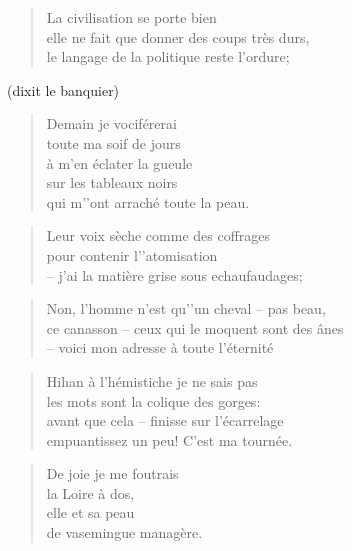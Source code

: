   \begin{verse}
    La civilisation se porte bien\\
    elle ne fait que donner des coups très durs,\\
    le langage de la politique reste l’ordure;
  \end{verse}
  \begin{center}


    (dixit le banquier)
  \end{center}
  \begin{verse}
    Demain je vociférerai\\
    toute ma soif de jours\\
    à m’en éclater la gueule\\
    sur les tableaux noirs\\
    qui m'’ont arraché toute la peau.
  \end{verse}
  \begin{verse}
    Leur voix sèche comme des coffrages\\
    pour contenir l’'atomisation\\
    -- j’ai la matière grise sous echaufaudages;
  \end{verse}
  \begin{verse}
    Non, l'homme n'est qu’'un cheval -- pas beau,\\
    ce canasson -- ceux qui le moquent sont des ânes\\
    -- voici mon adresse à toute l’éternité
  \end{verse}
  \begin{center}
  \end{center}
  \begin{verse}
    Hihan à l’hémistiche je ne sais pas\\
    les mots sont la colique des gorges:\\
    avant que cela -- finisse sur l’écarrelage\\
    empuantissez un peu! C'est ma tournée.
  \end{verse}
  \begin{verse}
    De joie je me foutrais\\
    la Loire à dos,\\
    elle et sa peau\\
    de vasemingue managère.
  \end{verse}
